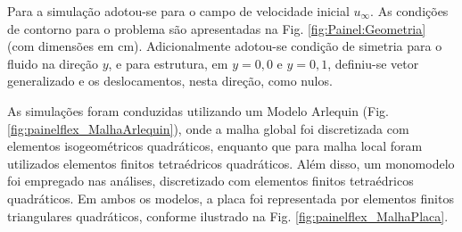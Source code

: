 \documentclass[tese_patricia]{subfiles}
\begin{document}
Para a simulação adotou-se para o campo de velocidade inicial $u_{\infty}$. As condições de contorno para o problema são apresentadas na Fig. \ref{fig:Painel:Geometria} (com dimensões em cm). Adicionalmente adotou-se condição de simetria para o fluido na direção $y$, e para estrutura, em $y=0,0$ e $y=0,1$, definiu-se vetor generalizado e os deslocamentos, nesta direção, como nulos.

As simulações foram conduzidas utilizando um Modelo Arlequin (Fig. \ref{fig:painelflex_MalhaArlequin}), onde a malha global foi discretizada com elementos isogeométricos quadráticos, enquanto que para malha local foram utilizados elementos finitos tetraédricos quadráticos. Além disso, um monomodelo foi empregado nas análises, discretizado com elementos finitos tetraédricos quadráticos. Em ambos os modelos, a placa foi representada por elementos finitos triangulares quadráticos, conforme ilustrado na Fig. \ref{fig:painelflex_MalhaPlaca}.
\end{document}
